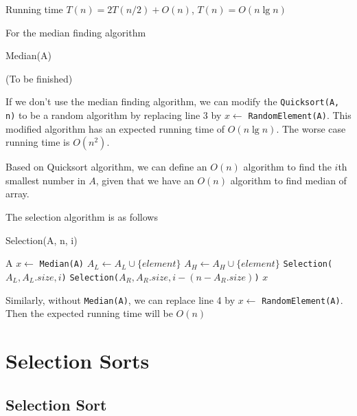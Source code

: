 					Running time $T(n) = 2T(n/2) + O(n)$, $T(n) = O(n\lg n)$

					For the median finding algorithm
					\begin{algorithm}[h]
						\caption{Median(A)}
						\begin{algorithmic}[1]
							\State (To be finished)
						\end{algorithmic}
					\end{algorithm}

					If we don't use the median finding algorithm, we can modify the \texttt{Quicksort(A, n)} to be a random algorithm by replacing line 3 by $x \gets$ \texttt{RandomElement(A)}. This modified algorithm has an expected running time of $O(n\lg n)$. The worse case running time is $O(n^2)$.

					Based on Quicksort algorithm, we can define an $O(n)$ algorithm to find the $i$th smallest number in $A$, given that we have an $O(n)$ algorithm to find median of array.

					The selection algorithm is as follows
					\begin{algorithm}[h]
						\caption{Selection(A, n, i)}
						\begin{algorithmic}[1]
								\State \Return A
							\Else
								\State $x \gets$ \texttt{Median(A)}
										\State $A_L \gets A_L \cup \{element\}$
									\Else
										\State $A_H \gets A_H \cup \{element\}$
									\EndIf
								\EndFor
									\State \Return \texttt{Selection($A_L, A_L.size, i$)}
									\State \Return \texttt{Selection($A_R, A_R.size, i - (n - A_R.size)$)}
								\Else
									\State \Return $x$
								\EndIf
							\EndIf
						\end{algorithmic}
					\end{algorithm}

					Similarly, without \texttt{Median(A)}, we can replace line 4 by $x \gets$ \texttt{RandomElement(A)}. Then the expected running time will be $O(n)$

			\section{Selection Sorts}
				\subsection{Selection Sort}

